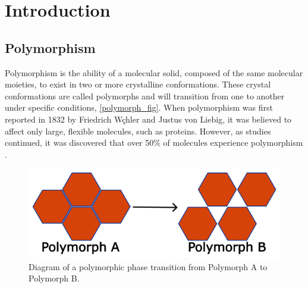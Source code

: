 
\chapter{Introduction}
\label{chap:Intro}
\section{Polymorphism}
Polymorphism is the ability of a molecular solid, composed of the same molecular moieties, to exist in two or more crystalline conformations. These crystal conformations are called polymorphs and will transition from one to another under specific conditions, \autoref{polymorph_fig}. When polymorphism was first reported in 1832 by Friedrich Wçhler and Justus von Liebig, it was believed to affect only large, flexible molecules, such as proteins. However, as studies continued, it was discovered that over 50\% of molecules experience polymorphism \citep{cruz-cabeza_facts_2015,Hoja}.

\begin{figure}[ht]
    \centering
    \includegraphics[width=12cm]{src/figures/intro_figs/polymorphism_fig.png}
    \caption{Diagram of a polymorphic phase transition from Polymorph A to Polymorph B.}
    \label{polymorph_fig}
\end{figure}

